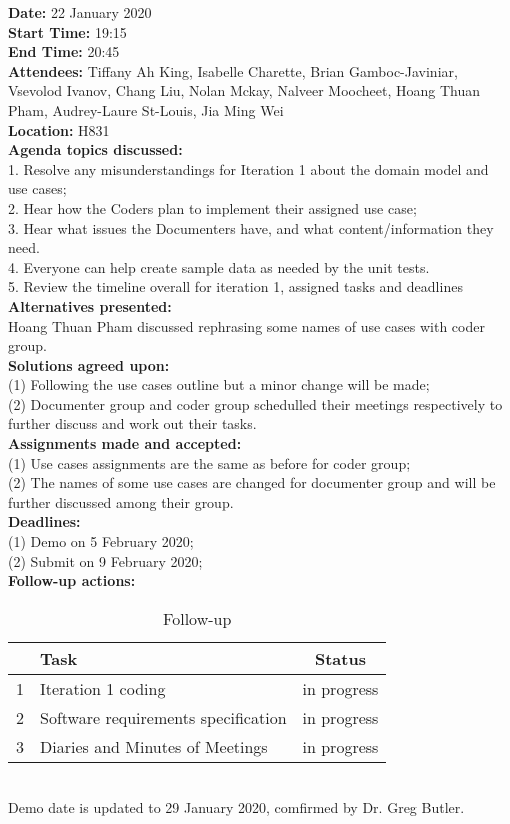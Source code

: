 \documentclass[12pt]{article}
\begin{document}
\newpage
{\bf Date:} 22 January 2020\\
{\bf Start Time:} 19:15\\
{\bf End Time:}  20:45\\
{\bf Attendees:} Tiffany Ah King,
Isabelle Charette,
Brian Gamboc-Javiniar,
Vsevolod Ivanov,
Chang Liu,
Nolan Mckay,
Nalveer Moocheet,
Hoang Thuan Pham,
Audrey-Laure St-Louis,
Jia Ming Wei\\
{\bf Location:} H831 \\
{\bf Agenda topics discussed:} \\1. Resolve any misunderstandings for Iteration 1 about the domain model and use cases;
\\2. Hear how the Coders plan to implement their assigned use case;
\\3. Hear what issues the Documenters have, and what content/information they need. 
\\4. Everyone can help create sample data as needed by the unit tests. 
\\5. Review the timeline overall for iteration 1, assigned tasks and deadlines\\
{\bf Alternatives presented:} \\ Hoang Thuan Pham discussed rephrasing some names of use cases with coder group.\\
{\bf Solutions agreed upon:} \\(1) Following the use cases outline but a minor change will be made; \\(2) Documenter group and coder group schedulled their meetings respectively to further discuss and work out their tasks. \\
{\bf Assignments made and accepted:} \\(1) Use cases assignments are the same as before for coder group;\\(2) The names of some use cases are changed for documenter group and will be further discussed among their group.\\
{\bf Deadlines:} \\(1) Demo on 5 February 2020; \\(2)  Submit on 9 February 2020; \\
{\bf Follow-up actions:} \\
\begin{table}[h!]
\centering
 \begin{tabular}{||l l c ||} 
 \hline
   & Task & Status\\ [0.5ex] 
 \hline\hline
 1 & Iteration 1 coding & in progress \\ 
 2 & Software requirements specification &  in progress\\
 3 & Diaries and Minutes of Meetings &  in progress\\[1ex] 

 \hline
 \end{tabular}
\caption{Follow-up }
\label{table:1}
\end{table}
\\Demo date is updated to 29 January 2020, comfirmed by Dr. Greg Butler.\\
\end{document}
